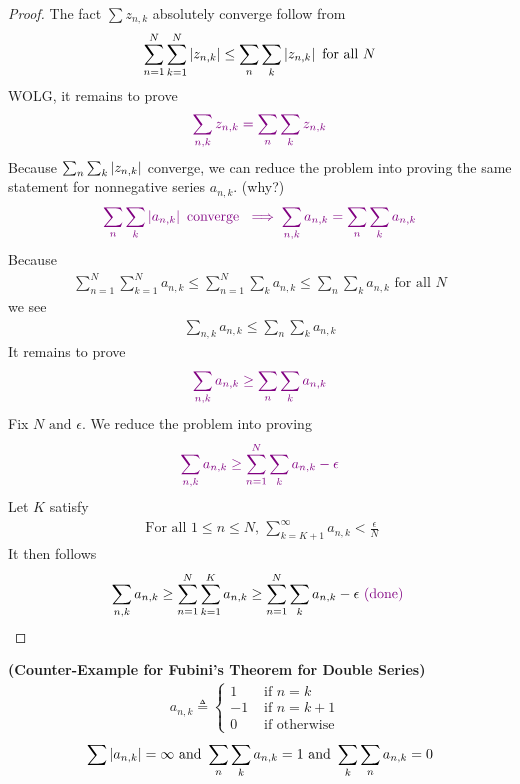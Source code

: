 \documentclass{report}
\begin{document}
\begin{proof}
The fact $\sum z_{n,k}$ absolutely converge follow from 
\begin{align*}
\sum_{n=1}^N \sum_{k=1}^N \left|z_{n,k}\right|\leq \sum_n \sum_k \left|z_{n,k}\right|\text{ for all }N
\end{align*}
WOLG, it remains to prove 
\begin{align*}
\textcolor{violet}{\sum_{n,k}z_{n,k}=\sum_n \sum_k z_{n,k}}
\end{align*}
Because $\sum_n \sum_k \left|z_{n,k}\right|$ converge, we can reduce the problem into proving the same statement for nonnegative series $a_{n,k}$. (why?)
\begin{align*}
  \textcolor{violet}{\sum_n \sum_k \left|a_{n,k}\right|\text{ converge }\implies \sum_{n,k}a_{n,k}=\sum_n \sum_k a_{n,k}}
\end{align*}
Because 
\begin{align*}
\sum_{n=1}^N \sum_{k=1}^N a_{n,k} \leq  \sum_{n=1}^N \sum_{k} a_{n,k}\leq \sum_n \sum_k a_{n,k}\text{ for all }N
\end{align*}
we see 
\begin{align*}
\sum_{n,k}a_{n,k}\leq \sum_n \sum_k a_{n,k}
\end{align*}
It remains to prove 
\begin{align*}
  \textcolor{violet}{\sum_{n,k}a_{n,k}\geq \sum_{n} \sum_k a_{n,k}}
\end{align*}
Fix  $N\text{ and }\epsilon $. We reduce the problem into proving 
\begin{align*}
  \textcolor{violet}{\sum_{n,k}a_{n,k} \geq \sum_{n=1}^N \sum_{k} a_{n,k} - \epsilon}
\end{align*}
Let $K$ satisfy 
 \begin{align*}
\text{ For all $1\leq n\leq N$, }\sum_{k=K+1}^\infty a_{n,k} < \frac{\epsilon}{N} 
\end{align*}
It then follows 
\begin{align*}
\sum_{n,k} a_{n,k}\geq \sum_{n=1}^N \sum_{k=1}^K a_{n,k}\geq \sum_{n=1}^N \sum_k a_{n,k}-\epsilon  \textcolor{violet}{\text{ (done) }}
\end{align*}

\end{proof}
\begin{Example}{\textbf{(Counter-Example for Fubini's Theorem for Double Series)}}{}
\begin{align*}
a_{n,k}\triangleq \begin{cases}
  1& \text{ if $n=k$ }\\
  -1& \text{ if $n=k+1$ }\\
  0& \text{ if otherwise }
\end{cases}
\end{align*}
\begin{align*}
\sum \left|a_{n,k}\right|=\infty \text{ and }\sum_n \sum_k a_{n,k}=1\text{ and }\sum_k \sum_n a_{n,k}=0
\end{align*}
\end{Example}
\end{document}
